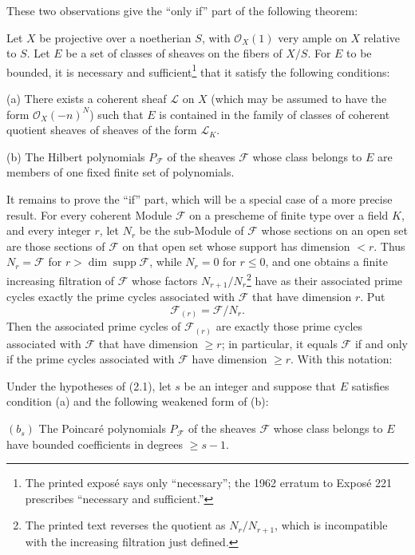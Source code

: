 These two observations give the “only if” part of the following theorem:

 Let $X$ be projective over a noetherian $S$, with
$\mathcal O_X(1)$ very ample on $X$ relative to $S$. Let $E$ be a set of
classes of sheaves on the fibers of $X/S$. For $E$ to be bounded, it is
necessary and sufficient\footnote{The printed exposé says only “necessary”;
the 1962 erratum to Exposé 221 prescribes “necessary and sufficient.”} that it
satisfy the following conditions:

\medskip
\noindent (a) There exists a coherent sheaf $\mathcal L$ on $X$ (which may be
assumed to have the form $\mathcal O_X(-n)^N$) such that $E$ is contained in
the family of classes of coherent quotient sheaves of sheaves of the form
$\mathcal L_K$.

\smallskip
\noindent (b) The Hilbert polynomials $P_{\mathcal F}$ of the sheaves
$\mathcal F$ whose class belongs to $E$ are members of one fixed finite set of
polynomials.

It remains to prove the “if” part, which will be a special case of a more
precise result. For every coherent Module $\mathcal F$ on a prescheme of finite
type over a field $K$, and every integer $r$, let $N_r$ be the sub-Module of
$\mathcal F$ whose sections on an open set are those sections of $\mathcal F$
on that open set whose support has dimension $<r$. Thus $N_r=\mathcal F$ for
$r>\dim\operatorname{supp}\mathcal F$, while $N_r=0$ for $r\leq0$, and one
obtains a finite increasing filtration of $\mathcal F$ whose factors
$N_{r+1}/N_r$\footnote{The printed text reverses the quotient as
$N_r/N_{r+1}$, which is incompatible with the increasing filtration just
defined.} have as their associated prime cycles exactly the prime cycles
associated with $\mathcal F$ that have dimension $r$. Put
\[
\mathcal F_{(r)}=\mathcal F/N_r.
\]
Then the associated prime cycles of $\mathcal F_{(r)}$ are exactly those prime
cycles associated with $\mathcal F$ that have dimension $\geq r$; in
particular, it equals $\mathcal F$ if and only if the prime cycles associated
with $\mathcal F$ have dimension $\geq r$. With this notation:

 Under the hypotheses of (2.1), let $s$ be an integer and
suppose that $E$ satisfies condition (a) and the following weakened form of
(b):

\medskip
\noindent $(b_s)$ The Poincaré polynomials $P_{\mathcal F}$ of the sheaves
$\mathcal F$ whose class belongs to $E$ have bounded coefficients in degrees
$\geq s-1$.

